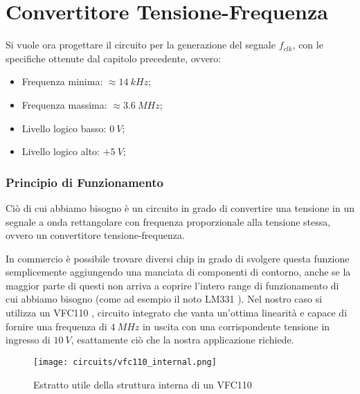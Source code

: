 \chapter{Convertitore Tensione-Frequenza}


Si vuole ora progettare il circuito per la generazione del segnale $f_{clk}$, con le
specifiche ottenute dal capitolo precedente, ovvero:

\begin{itemize}
    \item Frequenza minima: $\approx 14\ kHz$;
    \item Frequenza massima: $\approx 3.6\ MHz$;
    \item Livello logico basso: $0\ V$;
    \item Livello logico alto: $+5\ V$;
\end{itemize}


\subsection*{Principio di Funzionamento}


Ciò di cui abbiamo bisogno è un circuito in grado di convertire una tensione in un segnale
a onda rettangolare con frequenza proporzionale alla tensione stessa, ovvero un convertitore
tensione-frequenza.

In commercio è possibile trovare diversi chip in grado di svolgere questa funzione
semplicemente aggiungendo una manciata di componenti di contorno, anche se la maggior
parte di questi non arriva a coprire l'intero range di funzionamento di cui abbiamo bisogno
(come ad esempio il noto LM331 \cite{lm331}). Nel nostro caso si utilizza un VFC110
\cite{vfc110}, circuito integrato che vanta un'ottima linearità e capace di fornire una
frequenza di $4\ MHz$ in uscita con una corrispondente tensione in ingresso di $10\ V$,
esattamente ciò che la nostra applicazione richiede.

\begin{figure}[H]
    \centering
    \texttt{[image: circuits/vfc110\_internal.png]}
    \caption{Estratto utile della struttura interna di un VFC110}
    \label{vfc110_internal}
\end{figure}

